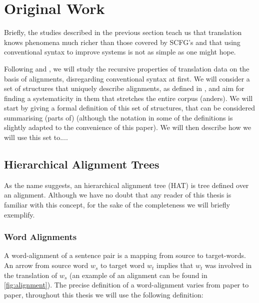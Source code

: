 \documentclass{report}
\theoremstyle{definition}
\theoremstyle{plain}
\begin{document}
\section{Original Work}

Briefly, the studies described in the previous section teach us that translation knows phenomena much richer than those covered by SCFG's and that using conventional syntax to improve systems is not as simple as one might hope. 



Following \cite{wu1997stochastic} and \cite{wellington2006empirical}, we will study the recursive properties of translation data on the basis of alignments, disregarding conventional syntax at first. We will consider a set of structures that uniquely describe alignments, as defined in \cite{simaan2013hats}, and aim for finding a systematicity in them that stretches the entire corpus (anders). We will start by giving a formal definition of this set of structures, that can be considered summarising (parts of) \cite{simaan2013hats} (although the notation in some of the definitions is slightly adapted to the convenience of this paper). We will then describe how we will use this set to....


\subsection{Hierarchical Alignment Trees}

As the name suggests, an hierarchical alignment tree (HAT) is tree defined over an alignment. Although we have no doubt that any reader of this thesis is familiar with this concept, for the sake of the completeness we will briefly exemplify.

\subsubsection{Word Alignments} A word-alignment of a sentence pair is a mapping from source to target-words. An arrow from source word $w_s$ to target word $w_t$ implies that $w_t$ was involved in the translation of $w_s$ (an example of an alignment can be found in \ref{fig:alignment}). The precise definition of a word-alignment varies from paper to paper, throughout this thesis we will use the following definition:
\end{document}
